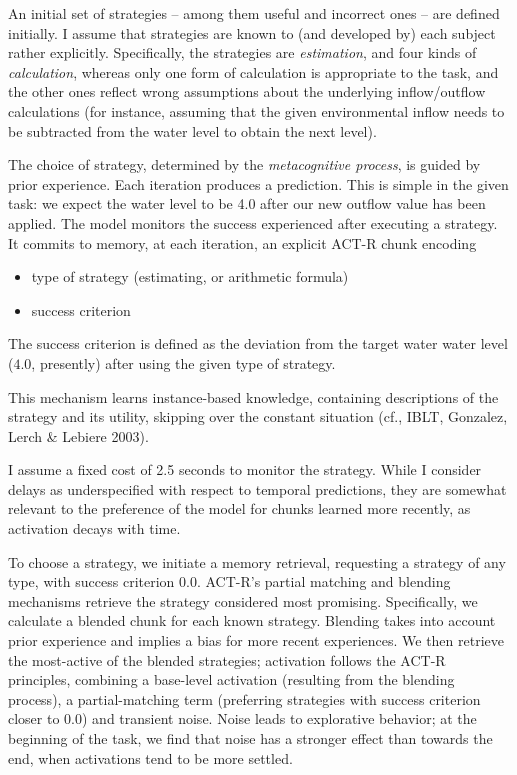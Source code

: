 \documentclass[twocolumn]{article}
\begin{document}
An initial set of strategies -- among them useful and incorrect ones -- are defined initially.  I assume that strategies are known to (and developed by) each subject rather explicitly.  Specifically, the strategies are \emph{estimation}, and four kinds of \emph{calculation}, whereas only one form of calculation is appropriate to the task, and the other ones reflect wrong assumptions about the underlying inflow/outflow calculations (for instance, assuming that the given environmental inflow needs to be subtracted from the water level to obtain the next level).

The choice of strategy, determined by the \emph{metacognitive process}, is guided by prior experience.  Each iteration produces a prediction.  This is simple in the given task: we expect the water level to be 4.0 after our new outflow value has been applied.   The model monitors the success experienced after executing a strategy.
It commits to memory, at each iteration, an explicit ACT-R chunk encoding

\begin{itemize}
\item type of strategy (estimating, or arithmetic formula)
\item success criterion
\end{itemize}

The success criterion is defined as the deviation from the target water water level ($4.0$, presently) after using the given type of strategy.

This mechanism learns instance-based knowledge, containing descriptions of the strategy and its utility, skipping over the constant situation (cf., IBLT, Gonzalez, Lerch \& Lebiere 2003).
 
I assume a fixed cost of 2.5 seconds to monitor the strategy.  While I consider delays as underspecified with respect to temporal predictions, they are somewhat relevant to the preference of the model for chunks learned more recently, as activation decays with time.

To choose a strategy, we initiate a memory retrieval, requesting a strategy of any type, with success criterion $0.0$.  ACT-R's partial matching and blending mechanisms retrieve the strategy considered most promising.  Specifically, we calculate a blended chunk for each known strategy.  Blending takes into account prior experience and implies a bias for more recent experiences.  We then retrieve the most-active of the blended strategies; activation follows the ACT-R principles, combining a base-level activation (resulting from the blending process), a partial-matching term (preferring strategies with success criterion closer to $0.0$) and transient noise.   Noise leads to explorative behavior; at the beginning of the task, we find that noise has a stronger effect than towards the end, when activations tend to be more settled.
\end{document}
